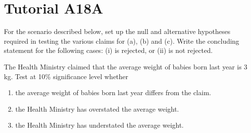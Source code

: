 \section{Tutorial A18A}

\begin{problem}
    For the scenario described below, set up the null and alternative hypotheses required in testing the various claims for (a), (b) and (c). Write the concluding statement for the following cases: (i) \nullhyp{} is rejected, or (ii) \nullhyp{} is not rejected.

    The Health Ministry claimed that the average weight of babies born last year is 3 kg. Test at 10\% significance level whether
    \begin{enumerate}
        \item the average weight of babies born last year differs from the claim.
        \item the Health Ministry has overstated the average weight.
        \item the Health Ministry has understated the average weight.
    \end{enumerate}
\end{problem}
